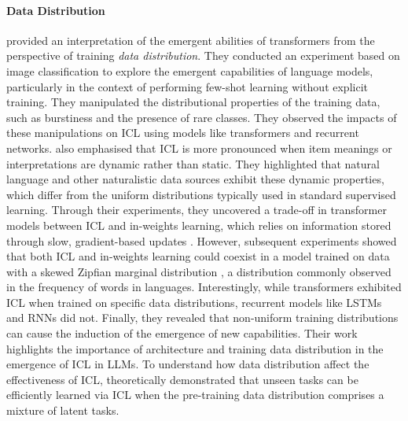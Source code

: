 \paragraph{Data Distribution} 
\citet{Chan2022DataDP} provided an interpretation of the emergent abilities of transformers from the perspective of training \textit{data distribution}. They conducted an experiment based on image classification to explore the emergent capabilities of language models, particularly in the context of performing few-shot learning without explicit training. 
They manipulated the distributional properties of the training data, such as burstiness and the presence of rare classes. They observed the impacts of these manipulations on ICL using models like transformers and recurrent networks. %
\citet{Chan2022DataDP} also emphasised that ICL is more pronounced when item meanings or interpretations are dynamic rather than static. They highlighted that natural language and other naturalistic data sources exhibit these dynamic properties, which differ from the uniform distributions typically used in standard supervised learning. Through their experiments, they uncovered a trade-off in transformer models between ICL and in-weights learning, which relies on information stored through slow, gradient-based updates \citep{Chan2022DataDP}.
However, subsequent experiments showed that both ICL and in-weights learning could coexist in a model trained on data with a skewed Zipfian marginal distribution \citep{Zipf1949HumanBA}, a distribution commonly observed in the frequency of words in languages.
Interestingly, while transformers exhibited ICL when trained on specific data distributions, recurrent models like LSTMs and RNNs did not. Finally, they revealed that non-uniform training distributions can cause the induction of the emergence of new capabilities. Their work highlights the importance of architecture and training data distribution in the emergence of ICL in LLMs. 
To understand how data distribution affect the effectiveness of ICL, \citet{Wies2023TheLO} theoretically demonstrated that unseen tasks can be efficiently learned via ICL when the pre-training data distribution comprises a mixture of latent tasks.

